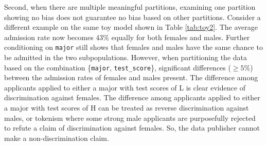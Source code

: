 \documentclass[twoside,leqno,twocolumn]{article}
\begin{document}
Second, when there are multiple meaningful partitions, examining one partition showing no bias does not guarantee no bias based on other partitions. Consider a different example on the same toy model shown in Table \ref{tab:toy2}. The average admission rate now becomes $43\%$ equally for both females and males. Further conditioning on \texttt{major} still shows that females and males have the same chance to be admitted in the two subpopulations. However, when partitioning the data based on the combination \{\texttt{major}, \texttt{test\_score}\}, significant differences ($\geq 5\%$) between the admission rates of females and males present. The difference among applicants applied to either a major with test scores of L is clear evidence of discrimination against females. The difference among applicants applied to either a major with test scores of H can be treated as reverse discrimination against males, or tokenism where some strong male applicants are purposefully rejected to refute a claim of discrimination against females. So, the data publisher cannot make a non-discrimination claim.


\end{document}
